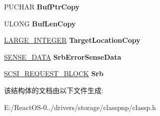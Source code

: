 \begin{DoxyCompactItemize}
\item 
\mbox{\label{struct___t_r_a_n_s_f_e_r___p_a_c_k_e_t_af505b344d23ab47376a0749653adb8cf}} 
P\+U\+C\+H\+AR {\bfseries Buf\+Ptr\+Copy}
\item 
\mbox{\label{struct___t_r_a_n_s_f_e_r___p_a_c_k_e_t_a71e267d7b1195eeea2352bd879e28ba9}} 
U\+L\+O\+NG {\bfseries Buf\+Len\+Copy}
\item 
\mbox{\label{struct___t_r_a_n_s_f_e_r___p_a_c_k_e_t_a113148c6a197c9f12268bfd58c41f84d}} 
\hyperlink{union___l_a_r_g_e___i_n_t_e_g_e_r}{L\+A\+R\+G\+E\+\_\+\+I\+N\+T\+E\+G\+ER} {\bfseries Target\+Location\+Copy}
\item 
\mbox{\label{struct___t_r_a_n_s_f_e_r___p_a_c_k_e_t_a6d593cafb2be8916d4cad64eb3614e8e}} 
\hyperlink{struct___s_e_n_s_e___d_a_t_a}{S\+E\+N\+S\+E\+\_\+\+D\+A\+TA} {\bfseries Srb\+Error\+Sense\+Data}
\item 
\mbox{\label{struct___t_r_a_n_s_f_e_r___p_a_c_k_e_t_a840c60b7d5d76a221b87d1bb7c5ab570}} 
\hyperlink{struct___s_c_s_i___r_e_q_u_e_s_t___b_l_o_c_k}{S\+C\+S\+I\+\_\+\+R\+E\+Q\+U\+E\+S\+T\+\_\+\+B\+L\+O\+CK} {\bfseries Srb}
\end{DoxyCompactItemize}


该结构体的文档由以下文件生成\+:\begin{DoxyCompactItemize}
\item 
E\+:/\+React\+O\+S-\/0../drivers/storage/classpnp/classp.\+h\end{DoxyCompactItemize}
